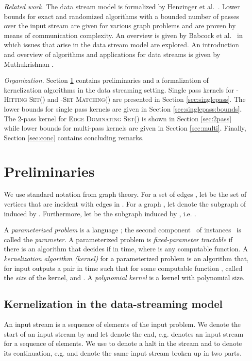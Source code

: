 \documentclass[draft,a4paper]{llncs}
\newcommand{\dHSk}{-\textsc{Hitting Set()}\xspace}
\newcommand{\dSMk}{-\textsc{Set Matching()}\xspace}
\newcommand{\EDSk}{\textsc{Edge Dominating Set()}\xspace}
\begin{document}
\emph{Related work.} The data stream model is formalized by Henzinger et al.~\cite{raghavan1999computing}. Lower bounds for exact and randomized algorithms with a bounded number of passes over the input stream are given for various graph problems and are proven by means of communication complexity. An overview is given by Babcock et al.~\cite{babcock2002models} in which issues that arise in the data stream model are explored. An introduction and overview of algorithms and applications for data streams is given by Muthukrishnan \cite{muthukrishnan2005data}. 


\emph{Organization.} 
Section \ref{sec:prelim} contains preliminaries and a formalization of kernelization algorithms in the data streaming setting. Single pass kernels for \dHSk and \dSMk are presented in Section \ref{sec:singlepass}. The lower bounds for single pass kernels are given in Section \ref{sec:singlepass:bounds}. The 2-pass kernel for \EDSk is shown in Section \ref{sec:2pass} while lower bounds for multi-pass kernels are given in Section \ref{sec:multi}. Finally, Section \ref{sec:conc} contains concluding remarks.

\section{Preliminaries} \label{sec:prelim}
We use standard notation from graph theory. For a set of edges , let  be the set of vertices that are 
incident with edges in . For a graph , let  denote the subgraph of  induced by .  Furthermore, let  be the subgraph induced by , i.e. . 

A \emph{parameterized problem} is a language ;
the second component~ of instances~ is called the \emph{parameter}. 
A parameterized problem is \emph{fixed-parameter tractable} if there is an algorithm that decides if  
in  time, where  is any computable function. 
A \emph{kernelization algorithm (kernel)} for a parameterized problem  is an algorithm that, for input  outputs a pair  in  time such that  for some computable function , called the \emph{size} of the kernel, and . A \emph{polynomial kernel} is a kernel with polynomial size.

\subsection*{Kernelization in the data-streaming model}

An input stream is a sequence of elements of the input problem. 
We denote the start of an input stream by  and let  denote the end, 
e.g.  denotes an input stream for a sequence of  elements. 
We use  to denote a halt in the stream and  to denote its continuation, 
e.g.  and  denote the same input stream broken up in two parts.
\end{document}
